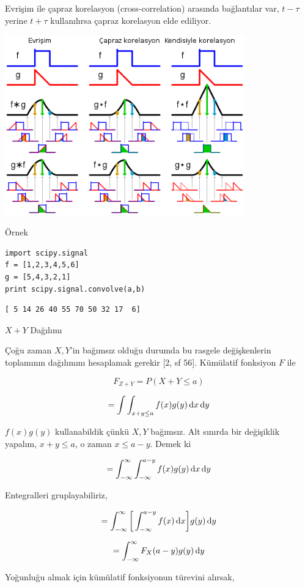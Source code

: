 \documentclass[12pt,fleqn]{article}\usepackage{../../common}
\begin{document}
Evrişim ile çapraz korelasyon (cross-correlation) arasında bağlantılar var,
$t-\tau$ yerine $t+\tau$ kullanılırsa çapraz korelasyon elde ediliyor.

\includegraphics[width=28em]{compar.png}

Örnek

\begin{verbatim}
import scipy.signal
f = [1,2,3,4,5,6]
g = [5,4,3,2,1]
print scipy.signal.convolve(a,b)
\end{verbatim}

\begin{verbatim}
[ 5 14 26 40 55 70 50 32 17  6]
\end{verbatim}

$X+Y$ Dağılımı

Çoğu zaman $X,Y$'in bağımsız olduğu durumda bu rasgele değişkenlerin
toplamının dağılımını hesaplamak gerekir [2, sf 56]. Kümülatif fonksiyon
$F$ ile

$$ F_{Z+Y} = P(X+Y \le a) $$

$$ = \int \int _{x+y \le a}^{} f(x)g(y) \,\mathrm{d} x \,\mathrm{d} y $$

$f(x)g(y)$ kullanabildik çünkü $X,Y$ bağımsız. Alt sınırda bir değişiklik
yapalım, $x+y \le a$, o zaman $x \le a-y$. Demek ki

$$
= \int _{-\infty}^{\infty} \int _{-\infty}^{a-y} f(x)g(y) \,\mathrm{d} x \,\mathrm{d} y
$$

Entegralleri gruplayabiliriz, 

$$
= \int _{-\infty}^{\infty}
\bigg[ \int _{-\infty}^{a-y} f(x) \,\mathrm{d} x \bigg] g(y) \,\mathrm{d} y
$$

$$ = \int _{-\infty}^{\infty} F_X(a-y) g(y) \,\mathrm{d} y $$

Yoğunluğu almak için kümülatif fonksiyonun türevini alırsak, 
\end{document}
